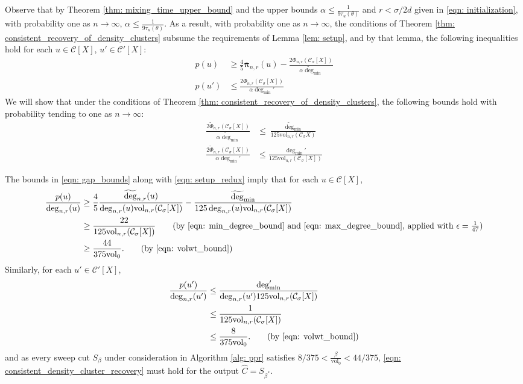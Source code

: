 \documentclass{article}
\newcommand{\vol}{\mathrm{vol}}
\newcommand{\1}{\mathbf{1}}
\newcommand{\pbf}{p}        %
\newcommand{\pibf}{\bm{\pi}}
\newcommand{\Xbf}{X}             %
\newcommand{\Cset}{\mathcal{C}}
\newcommand{\Csig}{\Cset_{\sigma}}
\newcommand{\degminpr}{\deg_{\min}'}
\newcommand{\degminwt}{\widetilde{\deg}_{\min}}
\theoremstyle{aldenthm}
\theoremstyle{aldenrmrk}
\begin{document}
Observe that by Theorem \ref{thm: mixing_time_upper_bound} and the upper bounds $\alpha \leq \frac{1}{9 \tau_{u}(\theta)}$ and $r < \sigma/2d$ given in \eqref{eqn: initialization}, with probability one as $n \to \infty$, $\alpha \leq \frac{1}{9 \tau_{u}(\theta)}$. As a result, with probability one as $n \to \infty$, the conditions of Theorem \ref{thm: consistent_recovery_of_density_clusters} subsume the requirements of Lemma \ref{lem: setup}, and by that lemma, the following inequalities hold for each $u \in \Cset[\Xbf]$, $u' \in \Cset'[\Xbf]$:
\begin{align}
\pbf(u) & \geq \frac{4}{5} \overline{\pibf}_{n,r}(u) - \frac{2 \Phi_{n,r}(\Csig[\Xbf])}{\alpha \degminwt} \nonumber \\
\pbf(u') & \leq \frac{2 \Phi_{n,r}(\Csig[\Xbf])}{\alpha \degminpr} \label{eqn: setup_redux}
\end{align}
We will show that under the conditions of Theorem \ref{thm: consistent_recovery_of_density_clusters}, the following bounds hold with probability tending to one as $n \to \infty$:
\begin{align}
\frac{2\widetilde{\Phi}_{n,r}(\Csig[\Xbf])}{\alpha \degminwt} & \leq \frac{\degminwt}{125 \vol_{n,r}(\Csig{\Xbf})} \nonumber \\
\frac{2\widetilde{\Phi}_{n,r}(\Csig[\Xbf])}{\alpha \degminpr} & \leq \frac{\degminpr}{125 \vol_{n,r}(\Csig[\Xbf])} \label{eqn: gap_bounds}
\end{align}

The bounds in \eqref{eqn: gap_bounds} along with \eqref{eqn: setup_redux} imply that for each $u \in \Cset[\Xbf]$,
\begin{align*}
\frac{\pbf(u)}{\deg_{n,r}(u)} & \geq \frac{4}{5} \frac{\widetilde{\deg}_{n,r}(u)}{\deg_{n,r}(u) \vol_{n,r}(\Csig[\Xbf])} - \frac{\degminwt}{125 \deg_{n,r}(u) \vol_{n,r}(\Csig[\Xbf])} \\
& \geq \frac{22}{125 \vol_{n,r}(\Csig[\Xbf])} \tag{by \eqref{eqn: min_degree_bound} and \eqref{eqn: max_degree_bound}, applied with $\epsilon = \frac{1}{47}$} \\
& \geq \frac{44}{375 \vol_0}. \tag{by \eqref{eqn: volwt_bound}}
\end{align*}
Similarly, for each $u' \in \Cset'[\Xbf]$,
\begin{align*}
\frac{\pbf(u')}{\deg_{n,r}(u')} & \leq \frac{\degminpr}{\deg_{n,r}(u') 125 \vol_{n,r}(\Csig[\Xbf])}  \\
& \leq \frac{1}{125 \vol_{n,r}(\Csig[\Xbf])} \\
& \leq \frac{8}{375 \vol_0}. \tag{by \eqref{eqn: volwt_bound}}
\end{align*}
and as every sweep cut $S_\beta$ under consideration in Algorithm \ref{alg: ppr} satisfies $8/375 < \frac{\beta}{\vol_0} < 44/375$, \eqref{eqn: consistent_density_cluster_recovery} must hold for the output $\widehat{C} = S_{\beta^*}$.
\end{document}
